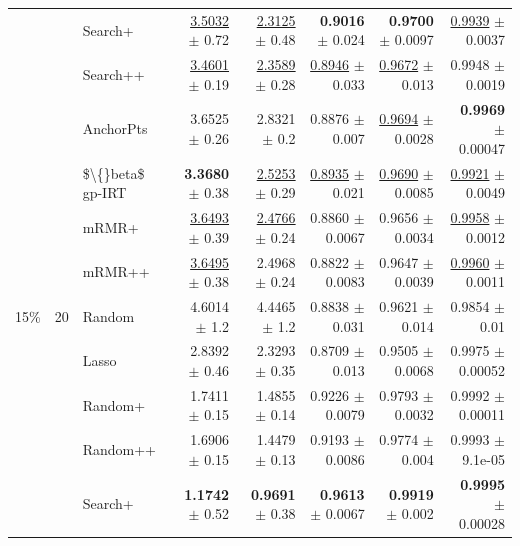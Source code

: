 \begin{longtable}{llp{}rrrrr}
 &  & Search+ & \underline{3.5032} {\scriptsize $\pm$ 0.72} & \underline{2.3125} {\scriptsize $\pm$ 0.48} & \textbf{0.9016} {\scriptsize $\pm$ 0.024} & \textbf{0.9700} {\scriptsize $\pm$ 0.0097} & \underline{0.9939} {\scriptsize $\pm$ 0.0037} \\
 &  & Search++ & \underline{3.4601} {\scriptsize $\pm$ 0.19} & \underline{2.3589} {\scriptsize $\pm$ 0.28} & \underline{0.8946} {\scriptsize $\pm$ 0.033} & \underline{0.9672} {\scriptsize $\pm$ 0.013} & 0.9948 {\scriptsize $\pm$ 0.0019} \\
 &  & AnchorPts & 3.6525 {\scriptsize $\pm$ 0.26} & 2.8321 {\scriptsize $\pm$ 0.2} & 0.8876 {\scriptsize $\pm$ 0.007} & \underline{0.9694} {\scriptsize $\pm$ 0.0028} & \textbf{0.9969} {\scriptsize $\pm$ 0.00047} \\
 &  & \$\textbackslash\{\}beta\$ gp-IRT & \textbf{3.3680} {\scriptsize $\pm$ 0.38} & \underline{2.5253} {\scriptsize $\pm$ 0.29} & \underline{0.8935} {\scriptsize $\pm$ 0.021} & \underline{0.9690} {\scriptsize $\pm$ 0.0085} & \underline{0.9921} {\scriptsize $\pm$ 0.0049} \\
 &  & mRMR+ & \underline{3.6493} {\scriptsize $\pm$ 0.39} & \underline{2.4766} {\scriptsize $\pm$ 0.24} & 0.8860 {\scriptsize $\pm$ 0.0067} & 0.9656 {\scriptsize $\pm$ 0.0034} & \underline{0.9958} {\scriptsize $\pm$ 0.0012} \\
 &  & mRMR++ & \underline{3.6495} {\scriptsize $\pm$ 0.38} & 2.4968 {\scriptsize $\pm$ 0.24} & 0.8822 {\scriptsize $\pm$ 0.0083} & 0.9647 {\scriptsize $\pm$ 0.0039} & \underline{0.9960} {\scriptsize $\pm$ 0.0011} \\
\midrule
15\% & 20 & Random & 4.6014 {\scriptsize $\pm$ 1.2} & 4.4465 {\scriptsize $\pm$ 1.2} & 0.8838 {\scriptsize $\pm$ 0.031} & 0.9621 {\scriptsize $\pm$ 0.014} & 0.9854 {\scriptsize $\pm$ 0.01} \\
 &  & Lasso & 2.8392 {\scriptsize $\pm$ 0.46} & 2.3293 {\scriptsize $\pm$ 0.35} & 0.8709 {\scriptsize $\pm$ 0.013} & 0.9505 {\scriptsize $\pm$ 0.0068} & 0.9975 {\scriptsize $\pm$ 0.00052} \\
 &  & Random+ & 1.7411 {\scriptsize $\pm$ 0.15} & 1.4855 {\scriptsize $\pm$ 0.14} & 0.9226 {\scriptsize $\pm$ 0.0079} & 0.9793 {\scriptsize $\pm$ 0.0032} & 0.9992 {\scriptsize $\pm$ 0.00011} \\
 &  & Random++ & 1.6906 {\scriptsize $\pm$ 0.15} & 1.4479 {\scriptsize $\pm$ 0.13} & 0.9193 {\scriptsize $\pm$ 0.0086} & 0.9774 {\scriptsize $\pm$ 0.004} & 0.9993 {\scriptsize $\pm$ 9.1e-05} \\
 &  & Search+ & \textbf{1.1742} {\scriptsize $\pm$ 0.52} & \textbf{0.9691} {\scriptsize $\pm$ 0.38} & \textbf{0.9613} {\scriptsize $\pm$ 0.0067} & \textbf{0.9919} {\scriptsize $\pm$ 0.002} & \textbf{0.9995} {\scriptsize $\pm$ 0.00028} \\

\end{longtable}
